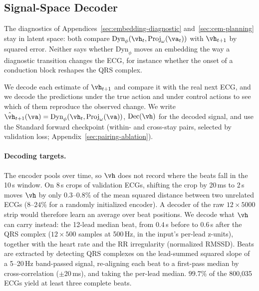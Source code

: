 
\subsection{Signal-Space Decoder}
\label{sec:decoder}

The diagnostics of Appendices~\ref{sec:embedding-diagnostic} and~\ref{sec:cem-planning} stay in latent space: both compare $\text{Dyn}_\phi(\vh_t,\text{Proj}_\omega(\va_t))$ with $\vh_{t+1}$ by squared error. Neither says whether $\text{Dyn}_\phi$ moves an embedding the way a diagnostic transition changes the ECG, for instance whether the onset of a conduction block reshapes the QRS complex.

We decode each estimate of $\vh_{t+1}$ and compare it with the real next ECG, and we decode the predictions under the true action and under control actions to see which of them reproduce the observed change. We write $\hat{\vh}_{t+1}(\va)=\text{Dyn}_\phi(\vh_t,\text{Proj}_\omega(\va))$, $\text{Dec}(\vh)$ for the decoded signal, and use the Standard forward checkpoint (within- and cross-stay pairs, selected by validation loss; Appendix~\ref{sec:pairing-ablation}).

\paragraph{Decoding targets.} The encoder pools over time, so $\vh$ does not record where the beats fall in the 10\,s window. On 8\,s crops of validation ECGs, shifting the crop by 20\,ms to 2\,s moves $\vh$ by only $0.3$--$0.8\%$ of the mean squared distance between two unrelated ECGs ($8$--$24\%$ for a randomly initialized encoder). A decoder of the raw $12\times5000$ strip would therefore learn an average over beat positions. We decode what $\vh$ can carry instead: the 12-lead median beat, from $0.4$\,s before to $0.6$\,s after the QRS complex ($12\times500$ samples at 500\,Hz, in the input's per-lead z-units), together with the heart rate and the RR irregularity (normalized RMSSD). Beats are extracted by detecting QRS complexes on the lead-summed squared slope of a 5--20\,Hz band-passed signal, re-aligning each beat to a first-pass median by cross-correlation ($\pm20$\,ms), and taking the per-lead median. $99.7\%$ of the 800{,}035 ECGs yield at least three complete beats.

